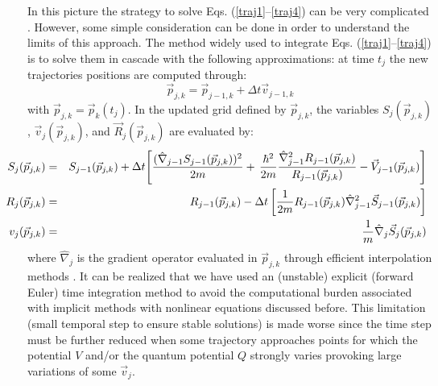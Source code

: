 \documentclass[nofootinbib, secnumarabic, amsmath, nobibnotes,10pt,aps,pra]{revtex4-1}
\begin{document}
In this picture the strategy to solve Eqs. (\ref{traj1}--\ref{traj4})
can be very complicated \cite{om.Wyatt1, om.Wyatt2, om.Wyatt3,
om.Frederick}. However, some simple consideration can be done in
order to understand the limits of this approach. The method widely
used \cite{om.Wyatt1, om.Wyatt2, om.Wyatt3, om.Frederick} to
integrate Eqs. (\ref{traj1}--\ref{traj4}) is to solve them in
cascade with the following approximations: at time $t_{j}$ the new
trajectories positions are computed through:
\begin{equation}
\vec {p}_{j,k} = \vec {p}_{j-1,k} + \Delta t\vec {v}_{j - 1,k}
\end{equation}
with $\vec {p}_{j,k} = \vec {p}_{k}(t_j)$. In the updated grid defined by $\vec {p}_{j,k}$, the variables ${S}_{j}(\vec {p}_{j,k})$, $\vec {v}_{j}(\vec {p}_{j,k})$, and $\vec {R}_{j}(\vec {p}_{j,k})$ are evaluated by:
\begin{eqnarray}
\hspace*{-24pt}{S}_{j}(\vec {p}_{j,k}) & =& {S}_{j - 1}(\vec {p}_{j,k}) + \Delta t\Bigg[ \frac{(\hat{\nabla}%
_{j - 1} {S}_{j - 1}(\vec {p}_{j,k}))^{2}}{2m}+\, \frac{\hbar^{2}}{2m}\frac{\hat{\nabla
}_{j - 1}^{2}{R}_{j - 1}(\vec {p}_{j,k})}{{R}_{j - 1}(\vec {p}_{j,k})} - \vec {V}_{j - 1}(\vec {p}_{j,k})\Bigg]\nonumber\\
\hspace*{-24pt}{R}_{j}(\vec {p}_{j,k}) & = &{R}_{j - 1}(\vec {p}_{j,k}) - \Delta t\left[ \frac{1}{2m}%
{R}_{j - 1}(\vec {p}_{j,k})\hat{\nabla}_{j - 1}^{2}\vec {S}_{j - 1}(\vec {p}_{j,k})\right] \nonumber\\
\hspace*{-24pt}{v}_{j}(\vec {p}_{j,k}) & = &\frac{1}{m}\hat{\nabla}_{j}\vec {S}_{j}(\vec {p}_{j,k})\nonumber%
\end{eqnarray}
where $\hat{\nabla}_{j}$ is the gradient operator evaluated in $\vec {p}_{j,k}$ through efficient interpolation methods \cite{om.Wyatt1, om.Wyatt2, om.Wyatt3, om.Frederick}. It can be realized that we have used an (unstable) explicit (forward Euler) time integration method
 \cite{om.Striwerda} to avoid the computational burden associated with implicit methods with nonlinear equations discussed before. This limitation (small temporal step to ensure stable solutions) is made worse since the time step must be further reduced when some trajectory approaches points for which the potential $V$ and/or the quantum potential $Q$ strongly varies provoking large variations of some $\vec{v}_{j}$.
\end{document}
